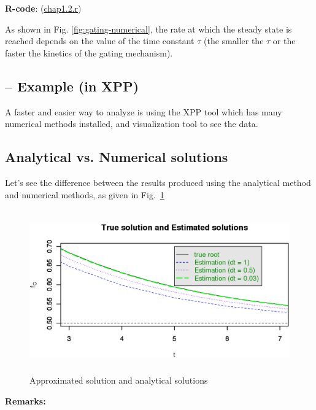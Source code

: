 {\bf R-code}: (\hyperref[chap1.2.r]{chap1.2.r})

As shown in Fig. \ref{fig:gating-numerical}, the rate at which the
steady state is reached depends on the value of the time constant
$\tau$ (the smaller the $\tau$ or the faster the kinetics of the
gating mechanism).

\subsection{-- Example (in XPP)}
\label{sec:example-in-xpp}

A faster and easier way to analyze is using the XPP tool which has
many numerical methods installed, and visualization tool to see the
data. 
% 

\subsection{Analytical vs. Numerical solutions}
\label{sec:analyt-vs.-numer}

Let's see the difference between the results produced using the
analytical method and numerical methods, as given in
Fig.~\ref{fig:gating-comparison}
\begin{figure}[htb]
  \centerline{\includegraphics[height=7cm]{./images/gating_comparison.eps}}
  \caption{Approximated solution and analytical
    solutions}\label{fig:gating-comparison}
\end{figure}

{\bf Remarks:}

